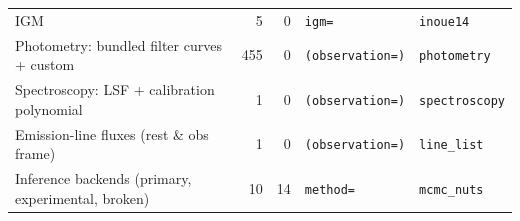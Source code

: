 \begin{table}
\begin{tabular}{lrrll}
IGM & 5 & 0 & \texttt{igm=} & \texttt{inoue14} \\
Photometry: bundled filter curves + custom & 455 & 0 & \texttt{(observation=)} & \texttt{photometry} \\
Spectroscopy: LSF + calibration polynomial & 1 & 0 & \texttt{(observation=)} & \texttt{spectroscopy} \\
Emission-line fluxes (rest \& obs frame) & 1 & 0 & \texttt{(observation=)} & \texttt{line\_list} \\
Inference backends (primary, experimental, broken) & 10 & 14 & \texttt{method=} & \texttt{mcmc\_nuts} \\
\bottomrule
\end{tabular}
\end{table}